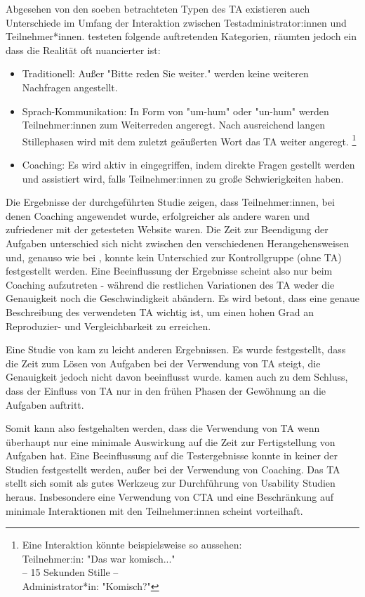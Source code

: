 Abgesehen von den soeben betrachteten Typen des \acl{TA} existieren auch Unterschiede im Umfang der
Interaktion zwischen Testadministrator:innen und Teilnehmer*innen.
\textcite{olmsted-hawalaThinkaloudProtocols2010} testeten folgende auftretenden Kategorien, räumten
jedoch ein dass die Realität oft nuancierter ist:
\begin{itemize}
  \item Traditionell: Außer "Bitte reden Sie weiter." werden keine weiteren Nachfragen angestellt.
  \item Sprach-Kommunikation: In Form von "um-hum" oder "un-hum" werden Teilnehmer:innen zum
    Weiterreden angeregt. Nach ausreichend langen Stillephasen wird mit dem zuletzt geäußerten Wort
    das \acl{TA} weiter angeregt. \footnote{Eine Interaktion könnte beispielsweise so aussehen:\\
    Teilnehmer:in: "Das war komisch..." \\ -- 15 Sekunden Stille -- \\ Administrator*in: "Komisch?"}
  \item Coaching: Es wird aktiv in eingegriffen, indem direkte Fragen gestellt werden und assistiert
    wird, falls Teilnehmer:innen zu große Schwierigkeiten haben.
\end{itemize}
Die Ergebnisse der \citeyear{olmsted-hawalaThinkaloudProtocols2010} durchgeführten Studie zeigen,
dass Teilnehmer:innen, bei denen Coaching angewendet wurde, erfolgreicher als andere waren und
zufriedener mit der getesteten Website waren. Die Zeit zur Beendigung der Aufgaben unterschied sich
nicht zwischen den verschiedenen Herangehensweisen und, genauso wie bei
\citeauthor{alhadretiRethinkingThinking2018}, konnte kein Unterschied zur Kontrollgruppe (ohne
\ac{TA}) festgestellt werden. Eine Beeinflussung der Ergebnisse scheint also nur beim Coaching
aufzutreten - während die restlichen Variationen des \ac{TA} weder die Genauigkeit noch die
Geschwindigkeit abändern. Es wird betont, dass eine genaue Beschreibung des verwendeten \acl{TA}
wichtig ist, um einen hohen Grad an Reproduzier- und Vergleichbarkeit zu erreichen.

Eine Studie von \textcite{rheniusEvaluationConcurrent1990} kam zu leicht anderen Ergebnissen. Es
wurde festgestellt, dass die Zeit zum Lösen von Aufgaben bei der Verwendung von \ac{TA} steigt, die
Genauigkeit jedoch nicht davon beeinflusst wurde. \citeauthor{rheniusEvaluationConcurrent1990} kamen
auch zu dem Schluss, dass der Einfluss von \ac{TA} nur in den frühen Phasen der Gewöhnung an die
Aufgaben auftritt.
\parencite{rheniusEvaluationConcurrent1990}

Somit kann also festgehalten werden, dass die Verwendung von \ac{TA} wenn überhaupt nur eine
minimale Auswirkung auf die Zeit zur Fertigstellung von Aufgaben hat. Eine Beeinflussung auf die
Testergebnisse konnte in keiner der Studien festgestellt werden, außer bei der Verwendung von
Coaching. Das \acl{TA} stellt sich somit als gutes Werkzeug zur Durchführung von Usability Studien
heraus. Insbesondere eine Verwendung von \acl{CTA} und eine Beschränkung auf minimale Interaktionen
mit den Teilnehmer:innen scheint vorteilhaft.
